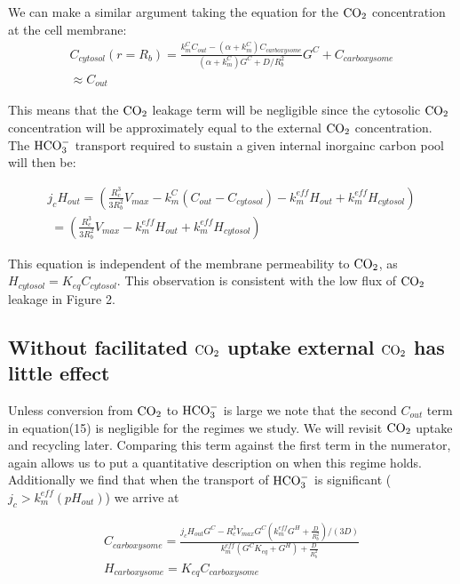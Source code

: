 \documentclass[]{article}
\begin{document}
We can make a similar argument taking the equation for the ${\rm CO_2}$ concentration at the cell membrane:
\begin{multline}
C_{cytosol}(r = R_b) = \frac{k_m^C C_{out} - (\alpha + k_m^C)C_{carboxysome}}{(\alpha+k_m^C)G^C + D/R_b^2}G^C + C_{carboxysome}\\
\approx C_{out}
\end{multline}

This means that the ${\rm CO_2}$ leakage term will be negligible since the cytosolic ${\rm CO_2}$ concentration will be approximately equal to the external ${\rm CO_2}$ concentration. The ${\rm HCO_3^-}$ transport required to sustain a given internal inorgainc carbon pool will then be:

\begin{multline}
j_c H_{out} =  \left(\frac{R_c^3}{3 R_b^2}  V_{max}  -k_m^C \left( C_{out} - C_{cytosol} \right) - k_m^{eff} H_{out} + k_m^{eff} H_{cytosol} \right) \\ 
\; = \left(\frac{R_c^3}{3 R_b^2}  V_{max}  - k_m^{eff} H_{out} + k_m^{eff} H_{cytosol} \right)
\end{multline}

This equation is independent of the membrane permeability to ${\rm CO_2}$, as $H_{cytosol} = K_{eq}C_{cytosol}$. This observation is consistent with the low flux of ${\rm CO_2}$ leakage in Figure 2.

\subsection{Without facilitated ${\rm CO_2}$ uptake external ${\rm CO_2}$ has little effect}

Unless conversion from ${\rm CO_2}$ to ${\rm HCO_3^-}$ is large we note that the second $C_{out}$ term in equation(15) is negligible for the regimes we study. We will revisit ${\rm CO_2}$ uptake and recycling later. Comparing this term against the first term in the numerator, again allows us to put a quantitative description on when this regime holds. Additionally we find that when the transport of ${\rm HCO_3^-}$ is significant ($j_c > k_m^{eff}(pH_{out})$) we arrive at

\begin{eqnarray}
	C_{carboxysome} = \frac{j_c H_{out}G^C - R_c^3 V_{max}G^C(k_m^{eff} G^H + \frac{D}{R_b^2})/(3D)}
	{k_m^{eff}(G^C K_{eq} +  G^H) + \frac{D}{R_b^2} }\\
	H_{carboxysome} = K_{eq} C_{carboxysome}
\end{eqnarray}
\end{document}

